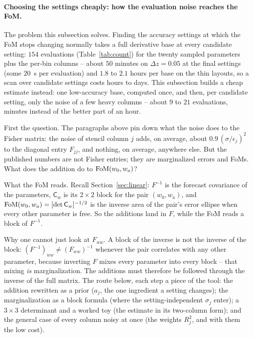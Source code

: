 \documentclass[11pt]{article}
\newcommand{\Cov}{\mathsf{C}}
\begin{document}
\paragraph{Choosing the settings cheaply: how the evaluation noise
reaches the FoM.}
The problem this subsection solves.  Finding the accuracy settings
at which the FoM stops changing normally takes a full derivative
base at every candidate setting: $154$ evaluations
(Table~\ref{tab:count}) for the twenty sampled parameters plus the
per-bin columns -- about $50$ minutes on $\Delta z = 0.05$ at the
final settings (some $20$~s per evaluation) and $1.8$ to $2.1$
hours per base on the thin layouts, so a scan over candidate
settings costs hours to days.  This subsection builds a cheap
estimate instead: one low-accuracy base, computed once, and then,
per candidate setting, only the noise of a few heavy columns --
about $9$ to $21$ evaluations, minutes instead of the better part
of an hour.

First the question.  The paragraphs above pin down what the noise does
to the Fisher matrix: the noise of stencil column $j$ adds, on
average, about $0.9\,(\sigma/\epsilon_j)^2$ to the diagonal entry
$F_{jj}$, and nothing, on average, anywhere else.  But the published
numbers are not Fisher entries; they are marginalized errors and FoMs.
What does the addition do to ${\rm FoM}(w_0, w_a)$?

What the FoM reads.  Recall Section~\ref{sec:linear}: $F^{-1}$ is the
forecast covariance of the parameters, $\Cov_w$ is its $2 \times 2$
block for the pair $(w_0, w_a)$, and
${\rm FoM}(w_0, w_a) = [\det\Cov_w]^{-1/2}$ is the inverse area of the
pair's error ellipse when every other parameter is free.  So the
additions land in $F$, while the FoM reads a block of $F^{-1}$.

Why one cannot just look at $F_{ww}$.  A block of the inverse is not
the inverse of the block: $(F^{-1})_{ww} \ne (F_{ww})^{-1}$ whenever
the pair correlates with any other parameter, because inverting $F$
mixes every parameter into every block -- that mixing \emph{is}
marginalization.  The additions must therefore be followed through the
inverse of the full matrix.  The route below, each step a piece of
the tool: the addition rewritten as a prior ($a_j$, the one
ingredient a setting changes); the marginalization as a block
formula (where the setting-independent $\sigma_j$ enter); a
$3 \times 3$ determinant and a worked toy (the estimate in its
two-column form); and the general case of every column noisy at
once (the weights $R_j^2$, and with them the low cost).
\end{document}
